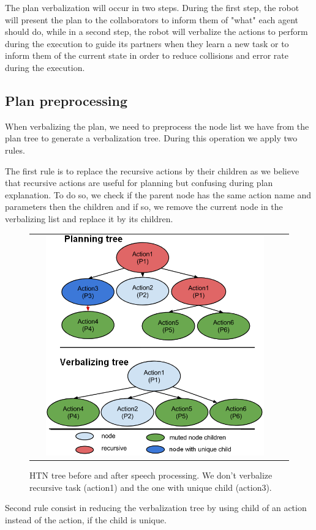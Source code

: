 \documentclass{llncs}
\begin{document}
The plan verbalization will occur in two steps.
During the first step, the robot will present the plan to the collaborators to inform them of "what" each agent should do, while in a second step, the robot will verbalize the actions to perform during the execution to guide its partners when they learn a new task or to inform them of the current state in order to reduce collisions and error rate during the execution.


\subsection{Plan preprocessing}
\label{preprocess}
When verbalizing the plan, we need to preprocess the node list we have from the plan tree to generate a verbalization tree.
During this operation we apply two rules.

The first rule is to replace the recursive actions by their children as we believe that recursive actions are useful for planning but confusing during plan explanation. To do so, we check if the parent node has the same action name and parameters then the children and if so, we remove the current node in the verbalizing list and replace it by its children.

\begin{figure}[ht!]
 \centering
 \begin{tabular}{cc}
  \includegraphics[width=0.9\textwidth]{img/rules.png}
 \end{tabular}
 \caption{HTN tree before and after speech processing. We don't verbalize recursive task (action1) and the one with unique child (action3).}
 \label{fig:tree_processing}
   \vspace{-6pt}
 \end{figure}
Second rule consist in reducing the verbalization tree by using child of an action instead of the action, if the child is unique.
\end{document}
